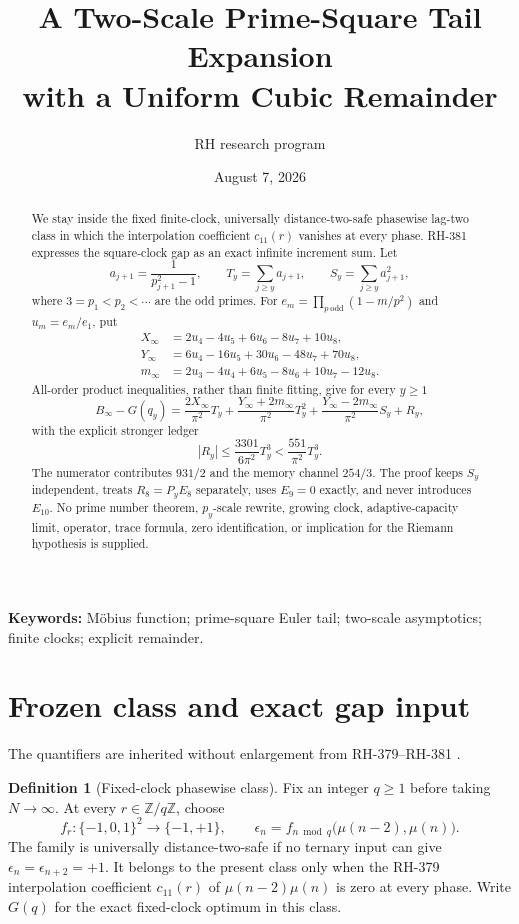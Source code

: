 \documentclass[11pt]{article}
\title{A Two-Scale Prime-Square Tail Expansion\\
with a Uniform Cubic Remainder}
\author{RH research program}
\date{August 7, 2026}
\theoremstyle{definition}
\newtheorem{definition}[theorem]{Definition}
\theoremstyle{remark}
\newcommand{\mob}{\mu}
\newcommand{\Z}{\mathbb Z}
\begin{document}
\maketitle

\begin{abstract}
We stay inside the fixed finite-clock, universally distance-two-safe
phasewise lag-two class in which the interpolation coefficient $c_{11}(r)$
vanishes at every phase.  RH-381 expresses the square-clock gap as an exact
infinite increment sum.  Let
\[
 a_{j+1}=\frac1{p_{j+1}^{2}-1},\qquad
 T_y=\sum_{j\ge y}a_{j+1},\qquad
 S_y=\sum_{j\ge y}a_{j+1}^{2},
\]
where $3=p_1<p_2<\cdots$ are the odd primes.  For
$e_m=\prod_{p\ \mathrm{odd}}(1-m/p^2)$ and $u_m=e_m/e_1$, put
\begin{align*}
 X_\infty&=2u_4-4u_5+6u_6-8u_7+10u_8,\\
 Y_\infty&=6u_4-16u_5+30u_6-48u_7+70u_8,\\
 m_\infty&=2u_3-4u_4+6u_5-8u_6+10u_7-12u_8.
\end{align*}
All-order product inequalities, rather than finite fitting, give for every
$y\ge1$
\[
 B_\infty-G(q_y)
 =\frac{2X_\infty}{\pi^2}T_y
 +\frac{Y_\infty+2m_\infty}{\pi^2}T_y^2
 +\frac{Y_\infty-2m_\infty}{\pi^2}S_y+R_y,
\]
with the explicit stronger ledger
\[
 |R_y|\le \frac{3301}{6\pi^2}T_y^3
 <\frac{551}{\pi^2}T_y^3.
\]
The numerator contributes $931/2$ and the memory channel $254/3$.
The proof keeps $S_y$ independent, treats $R_8=P_yE_8$ separately, uses
$E_9=0$ exactly, and never introduces $E_{10}$.  No prime number theorem,
$p_y$-scale rewrite, growing clock, adaptive-capacity limit, operator,
trace formula, zero identification, or implication for the Riemann
hypothesis is supplied.
\end{abstract}

\noindent\textbf{Keywords:} M\"obius function; prime-square Euler tail;
two-scale asymptotics; finite clocks; explicit remainder.

\section{Frozen class and exact gap input}

The quantifiers are inherited without enlargement from RH-379--RH-381
\cite{RH379,RH380,RH381}.

\begin{definition}[Fixed-clock phasewise class]
Fix an integer $q\ge1$ before taking $N\to\infty$.  At every
$r\in\Z/q\Z$, choose
\[
 f_r:\{-1,0,1\}^2\longrightarrow\{-1,+1\},\qquad
 \epsilon_n=f_{n\bmod q}\bigl(\mob(n-2),\mob(n)\bigr).
\]
The family is universally distance-two-safe if no ternary input can give
$\epsilon_n=\epsilon_{n+2}=+1$.  It belongs to the present class only when
the RH-379 interpolation coefficient $c_{11}(r)$ of
$\mob(n-2)\mob(n)$ is zero at every phase.  Write $G(q)$ for the exact
fixed-clock optimum in this class.
\end{definition}
\end{document}
